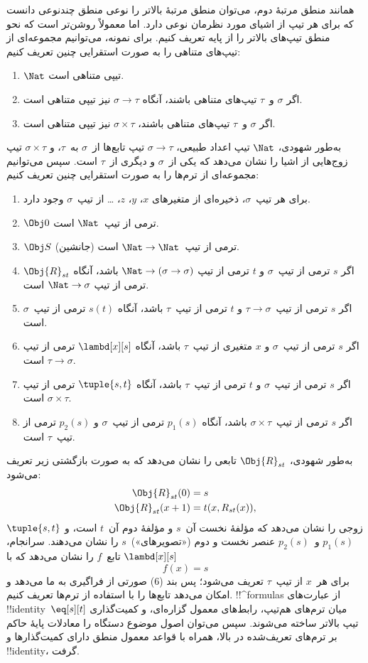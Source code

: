 \documentclass[../../../include/open-logic-section]{subfiles}
\begin{document}
همانند منطق مرتبهٔ دوم، می‌توان منطق مرتبهٔ بالاتر را نوعی منطق چندنوعی
دانست که برای هر تیپ از اشیای مورد نظرمان نوعی دارد. اما معمولاً روشن‌تر
است که نحو منطق تیپ‌های بالاتر را از پایه تعریف کنیم. برای نمونه،
می‌توانیم مجموعه‌ای از تیپ‌های متناهی را به صورت استقرایی چنین تعریف
کنیم:
\begin{enumerate}
\item $\Nat$ تیپی متناهی است.
\item اگر $\sigma$ و~$\tau$ تیپ‌های متناهی باشند، آنگاه $\sigma
  \to \tau$ نیز تیپی متناهی است.
\item اگر $\sigma$ و~$\tau$ تیپ‌های متناهی باشند، $\sigma \times
  \tau$ نیز تیپی متناهی است.
\end{enumerate}
به‌طور شهودی، $\Nat$ تیپ اعداد طبیعی، $\sigma \to \tau$ تیپ تابع‌ها
از~$\sigma$ به~$\tau$، و $\sigma \times \tau$ تیپ زوج‌هایی از اشیا را
نشان می‌دهد که یکی از~$\sigma$ و دیگری از~$\tau$ است. سپس می‌توانیم
مجموعه‌ای از ترم‌ها را به صورت استقرایی چنین تعریف کنیم:
\begin{enumerate}
\item برای هر تیپ~$\sigma$، ذخیره‌ای از متغیرهای $x$، $y$، $z$، \dots
  از تیپ~$\sigma$ وجود دارد.
\item $\Obj 0$ ترمی از تیپ~$\Nat$ است.
\item $\Obj S$ (جانشین) ترمی از تیپ~$\Nat \to \Nat$ است.
\item اگر $s$ ترمی از تیپ~$\sigma$ و $t$ ترمی از تیپ
  $\Nat \to (\sigma \to \sigma)$ باشد، آنگاه $\Obj{R}_{st}$ ترمی از
  تیپ $\Nat \to \sigma$ است.
\item اگر $s$ ترمی از تیپ~$\tau \to \sigma$ و $t$ ترمی از تیپ~$\tau$
  باشد، آنگاه $s(t)$ ترمی از تیپ~$\sigma$ است.
\item اگر $s$ ترمی از تیپ~$\sigma$ و $x$ متغیری از تیپ~$\tau$ باشد،
  آنگاه $\lambd[x][s]$ ترمی از تیپ $\tau \to \sigma$ است.
\item اگر $s$ ترمی از تیپ~$\sigma$ و $t$ ترمی از تیپ~$\tau$ باشد،
  آنگاه $\tuple{s, t}$ ترمی از تیپ $\sigma \times \tau$ است.
\item اگر $s$ ترمی از تیپ~$\sigma \times \tau$ باشد، آنگاه $p_1(s)$
  ترمی از تیپ~$\sigma$ و $p_2(s)$ ترمی از تیپ~$\tau$ است.
\end{enumerate}
به‌طور شهودی، $\Obj{R}_{st}$ تابعی را نشان می‌دهد که به صورت بازگشتی
زیر تعریف می‌شود:
\begin{align*}
\Obj{R}_{st}(0) & = s \\
\Obj{R}_{st}(x+1) & = t(x, R_{st}(x)),
\end{align*}
$\tuple{s, t}$ زوجی را نشان می‌دهد که مؤلفهٔ نخست آن~$s$ و مؤلفهٔ دوم
آن~$t$ است، و $p_1(s)$ و~$p_2(s)$ عنصر نخست و دوم («تصویرهای»)~$s$ را
نشان می‌دهند. سرانجام، $\lambd[x][s]$ تابع~$f$ را نشان می‌دهد که با
\[
f(x) = s
\]
برای هر~$x$ از تیپ~$\tau$ تعریف می‌شود؛ پس بند (6) صورتی از فراگیری به
ما می‌دهد و امکان می‌دهد تابع‌ها را با استفاده از ترم‌ها تعریف کنیم.
!!^{formula}s از عبارت‌های !!{identity}~$\eq[s][t]$ میان ترم‌های هم‌تیپ،
رابط‌های معمول گزاره‌ای، و کمیت‌گذاری تیپ بالاتر ساخته می‌شوند. سپس
می‌توان اصول موضوع دستگاه را معادلات پایهٔ حاکم بر ترم‌های تعریف‌شده در
بالا، همراه با قواعد معمول منطق دارای کمیت‌گذارها و !!{identity}، گرفت.
\end{document}
